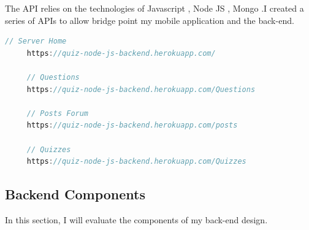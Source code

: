 The API  relies on the  technologies of Javascript  , Node JS , Mongo .I created  a series of APIs to allow bridge point my mobile application  and the back-end.

\begin{lstlisting}[language=Java, caption=API URL Endpoints]
     // Server Home
     https://quiz-node-js-backend.herokuapp.com/
     
     // Questions
     https://quiz-node-js-backend.herokuapp.com/Questions
     
     // Posts Forum 
     https://quiz-node-js-backend.herokuapp.com/posts
     
     // Quizzes 
     https://quiz-node-js-backend.herokuapp.com/Quizzes
\end{lstlisting}







\subsection{Backend Components }
In this section, I will evaluate the components of my back-end design.



